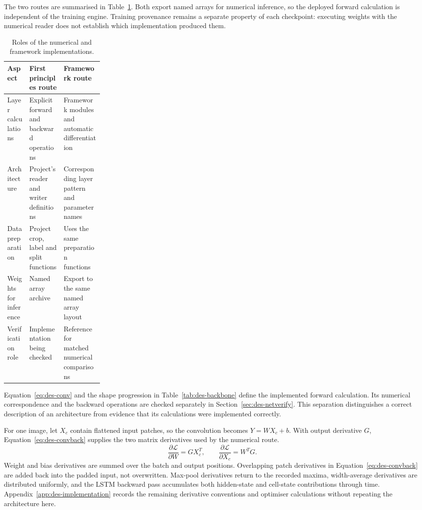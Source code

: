 The two routes are summarised in Table~\ref{tab:des-implementations}. Both export named arrays for numerical inference, so the deployed forward calculation is independent of the training engine. Training provenance remains a separate property of each checkpoint: executing weights with the numerical reader does not establish which implementation produced them.
\begin{table}[!htbp]\centering\small
\begin{tabularx}{\linewidth}{|p{0.23\linewidth}|X|X|}
\hline\textbf{Aspect}&\textbf{First principles route}&\textbf{Framework route}\\\hline
Layer calculations&Explicit forward and backward operations&Framework modules and automatic differentiation\\\hline
Architecture&Project's reader and writer definitions&Corresponding layer pattern and parameter names\\\hline
Data preparation&Project crop, label and split functions&Uses the same preparation functions\\\hline
Weights for inference&Named array archive&Export to the same named array layout\\\hline
Verification role&Implementation being checked&Reference for matched numerical comparisons\\\hline
\end{tabularx}
\caption{Roles of the numerical and framework implementations.}
\label{tab:des-implementations}
\end{table}

Equation~\ref{eq:des-conv} and the shape progression in Table~\ref{tab:des-backbone} define the implemented forward calculation. Its numerical correspondence and the backward operations are checked separately in Section~\ref{sec:des-netverify}. This separation distinguishes a correct description of an architecture from evidence that its calculations were implemented correctly.

For one image, let $X_c$ contain flattened input patches, so the convolution becomes $Y=WX_c+b$. With output derivative $G$, Equation~\ref{eq:des-convback} supplies the two matrix derivatives used by the numerical route.
\begin{equation}
\frac{\partial\mathcal L}{\partial W}=GX_c^T,\qquad
\frac{\partial\mathcal L}{\partial X_c}=W^TG.
\label{eq:des-convback}
\end{equation}
Weight and bias derivatives are summed over the batch and output positions. Overlapping patch derivatives in Equation~\ref{eq:des-convback} are added back into the padded input, not overwritten. Max-pool derivatives return to the recorded maxima, width-average derivatives are distributed uniformly, and the LSTM backward pass accumulates both hidden-state and cell-state contributions through time. Appendix~\ref{app:des-implementation} records the remaining derivative conventions and optimiser calculations without repeating the architecture here.

